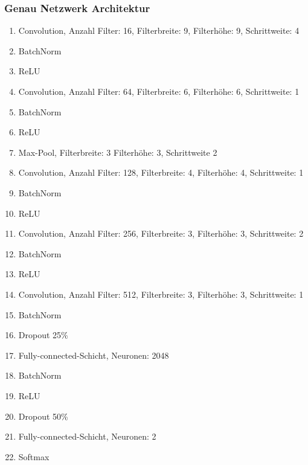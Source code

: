 \documentclass[12pt,a4paper]{report}
\begin{document}
\subsubsection{Genau Netzwerk Architektur}

\begin{enumerate}
    \setlength\itemsep{0cm}
    \setlength{\parskip}{0pt}
    \setlength{\parsep}{0pt}
    \item Convolution, Anzahl Filter: 16, Filterbreite: 9, Filterhöhe: 9, Schrittweite: 4
    \item BatchNorm
    \item ReLU
    \item Convolution, Anzahl Filter: 64, Filterbreite: 6, Filterhöhe: 6, Schrittweite: 1
    \item BatchNorm
    \item ReLU
    \item Max-Pool, Filterbreite: 3 Filterhöhe: 3, Schrittweite 2
    \item Convolution, Anzahl Filter: 128, Filterbreite: 4, Filterhöhe: 4, Schrittweite: 1
    \item BatchNorm
    \item ReLU
    \item Convolution, Anzahl Filter: 256, Filterbreite: 3, Filterhöhe: 3, Schrittweite: 2
    \item BatchNorm
    \item ReLU
    \item Convolution, Anzahl Filter: 512, Filterbreite: 3, Filterhöhe: 3, Schrittweite: 1
    \item BatchNorm
    \item Dropout 25\%
    \item Fully-connected-Schicht, Neuronen: 2048
    \item BatchNorm
    \item ReLU
    \item Dropout 50\%
    \item Fully-connected-Schicht, Neuronen: 2
    \item Softmax
\end{enumerate}
\end{document}
